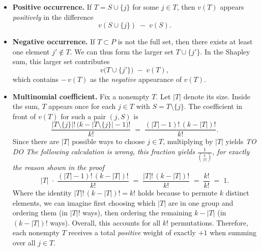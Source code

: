 \documentclass{article}
\begin{document}
\begin{proofsketch}
\begin{itemize}
    \item \textbf{Positive occurrence.} 
    If $T = S \cup \{j\}$ for some $j \in T$, then $v(T)$ appears \emph{positively} in the difference 
    \[
      v(S \cup \{j\}) \;-\; v(S).
    \]

    \item \textbf{Negative occurrence.} 
    If \(T \subset P\) is not the full set, then there exists at least one element \(j' \notin T\). We can thus form the larger set \(T \cup \{j'\}\). In the Shapley sum, this larger set contributes
    \[
      v\bigl(T \cup \{j'\}\bigr) \;-\; v(T),
    \]
    which contains \(-\,v(T)\) as the \emph{negative} appearance of \(v(T)\).

    \item \textbf{Multinomial coefficient.} 
    Fix a nonempty $T$. Let $|T|$ denote its size. Inside the sum, $T$ appears once for each $j \in T$ with $S = T \setminus \{j\}$. The coefficient in front of $v(T)$ for such a pair $(j,S)$ is
    \[
      \frac{|T\setminus\{j\}|!\,\bigl(k - |T\setminus\{j\}| -1\bigr)!}{k!}
      \;=\;
      \frac{(|T|-1)!\,(k - |T|)!}{k!}.
    \]
    Since there are $|T|$ possible ways to choose $j\in T$, multiplying by $|T|$ yields
    \textit{TO DO The following calculation is wrong, this fraction yields $\frac{1}{\binom{k}{|T|}}$, for exactly the reason shown in the proof}
    \[
      |T| 
      \;\cdot\; 
      \frac{(|T|-1)!\,(k - |T|)!}{k!}
      \;=\;
      \frac{|T|!\,(k - |T|)!}{k!}
      \;=\;
      \frac{k!}{k!}
      \;=\;
      1.
    \]
    Where the identity $|T|!\,(k - |T|)! = k!$ holds because to permute $k$ distinct elements, 
we can imagine first choosing which $|T|$ are in one group and ordering them 
(in $|T|!$ ways), then ordering the remaining $k - |T|$ (in $(k - |T|)!$ ways). 
Overall, this accounts for all $k!$ permutations. 
    Therefore, each nonempty $T$ receives a total \emph{positive} weight of exactly $+1$ when summing over all $j \in T$.


\end{itemize}
\end{proofsketch}
\end{document}

